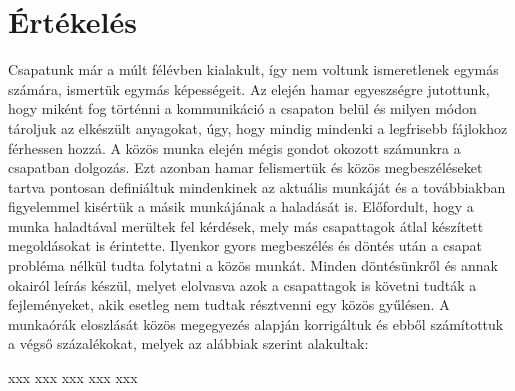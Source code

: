 \section{Értékelés}

Csapatunk már a múlt félévben kialakult, így nem voltunk ismeretlenek egymás számára, ismertük egymás képességeit. Az elején hamar egyeszségre jutottunk, hogy miként fog történni a kommunikáció a csapaton belül és milyen módon tároljuk az elkészült anyagokat, úgy, hogy mindig mindenki a legfrisebb fájlokhoz férhessen hozzá. 
A közös munka elején mégis gondot okozott számunkra a csapatban dolgozás. Ezt azonban hamar felismertük és közös megbeszéléseket tartva pontosan definiáltuk mindenkinek az aktuális munkáját és a továbbiakban figyelemmel kisértük a másik munkájának a haladását is. Előfordult, hogy a munka haladtával merültek fel kérdések, mely más csapattagok átlal készített megoldásokat is érintette. Ilyenkor gyors megbeszélés és döntés után a csapat probléma nélkül tudta folytatni a közös munkát. Minden döntésünkről és annak okairól leírás készül, melyet elolvasva azok a csapattagok is követni tudták a fejleményeket, akik esetleg nem tudtak résztvenni egy közös gyűlésen.
A munkaórák eloszlását közös megegyezés alapján korrigáltuk és ebből számítottuk a végső százalékokat, melyek az alábbiak szerint alakultak:

\begin{ertekeles}
{xxx}        %
{xxx}
{xxx}
{xxx}
{xxx}
\end{ertekeles}

